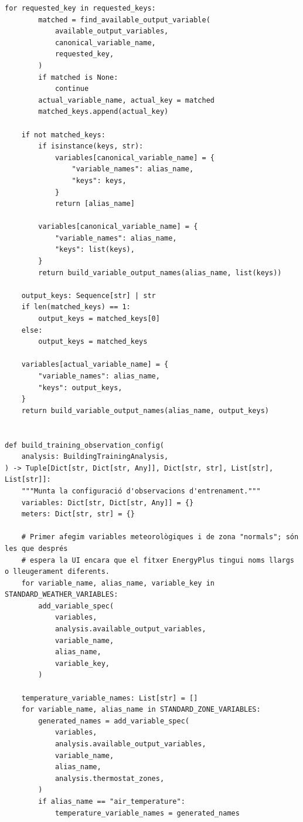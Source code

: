 \documentclass[10pt,a4paper]{article}
\begin{document}
\begin{lstlisting}[style=studioPython,caption={backend/afegir\_entorn\_config.py},label={lst:backend-afegir-entorn-config-py}]
    for requested_key in requested_keys:
        matched = find_available_output_variable(
            available_output_variables,
            canonical_variable_name,
            requested_key,
        )
        if matched is None:
            continue
        actual_variable_name, actual_key = matched
        matched_keys.append(actual_key)

    if not matched_keys:
        if isinstance(keys, str):
            variables[canonical_variable_name] = {
                "variable_names": alias_name,
                "keys": keys,
            }
            return [alias_name]

        variables[canonical_variable_name] = {
            "variable_names": alias_name,
            "keys": list(keys),
        }
        return build_variable_output_names(alias_name, list(keys))

    output_keys: Sequence[str] | str
    if len(matched_keys) == 1:
        output_keys = matched_keys[0]
    else:
        output_keys = matched_keys

    variables[actual_variable_name] = {
        "variable_names": alias_name,
        "keys": output_keys,
    }
    return build_variable_output_names(alias_name, output_keys)


def build_training_observation_config(
    analysis: BuildingTrainingAnalysis,
) -> Tuple[Dict[str, Dict[str, Any]], Dict[str, str], List[str], List[str]]:
    """Munta la configuració d'observacions d'entrenament."""
    variables: Dict[str, Dict[str, Any]] = {}
    meters: Dict[str, str] = {}

    # Primer afegim variables meteorològiques i de zona "normals"; són les que després
    # espera la UI encara que el fitxer EnergyPlus tingui noms llargs o lleugerament diferents.
    for variable_name, alias_name, variable_key in STANDARD_WEATHER_VARIABLES:
        add_variable_spec(
            variables,
            analysis.available_output_variables,
            variable_name,
            alias_name,
            variable_key,
        )

    temperature_variable_names: List[str] = []
    for variable_name, alias_name in STANDARD_ZONE_VARIABLES:
        generated_names = add_variable_spec(
            variables,
            analysis.available_output_variables,
            variable_name,
            alias_name,
            analysis.thermostat_zones,
        )
        if alias_name == "air_temperature":
            temperature_variable_names = generated_names


\end{lstlisting}
\end{document}
